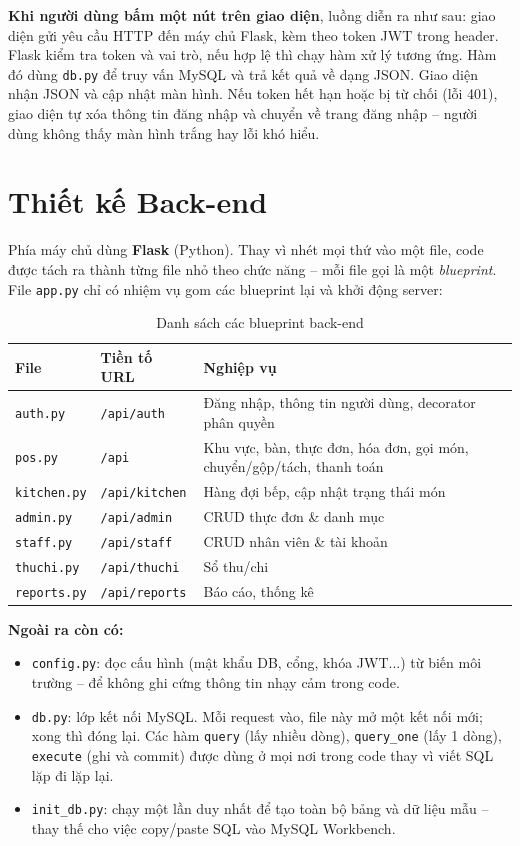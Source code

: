 \documentclass[12pt,a4paper]{report}
\newcommand{\code}[1]{\texttt{#1}}
\begin{document}
\textbf{Khi người dùng bấm một nút trên giao diện}, luồng diễn ra như sau: giao diện gửi yêu cầu HTTP đến máy chủ Flask, kèm theo token JWT trong header. Flask kiểm tra token và vai trò, nếu hợp lệ thì chạy hàm xử lý tương ứng. Hàm đó dùng \code{db.py} để truy vấn MySQL và trả kết quả về dạng JSON. Giao diện nhận JSON và cập nhật màn hình. Nếu token hết hạn hoặc bị từ chối (lỗi 401), giao diện tự xóa thông tin đăng nhập và chuyển về trang đăng nhập -- người dùng không thấy màn hình trắng hay lỗi khó hiểu.

\section{Thiết kế Back-end}

Phía máy chủ dùng \textbf{Flask} (Python). Thay vì nhét mọi thứ vào một file, code được tách ra thành từng file nhỏ theo chức năng -- mỗi file gọi là một \textit{blueprint}. File \code{app.py} chỉ có nhiệm vụ gom các blueprint lại và khởi động server:

\begin{table}[H]
\centering
\caption{Danh sách các blueprint back-end}
\begin{tabularx}{\textwidth}{L{2.8cm} L{3.2cm} X}
\toprule
\textbf{File} & \textbf{Tiền tố URL} & \textbf{Nghiệp vụ} \\
\midrule
\code{auth.py} & \code{/api/auth} & Đăng nhập, thông tin người dùng, decorator phân quyền \\
\code{pos.py} & \code{/api} & Khu vực, bàn, thực đơn, hóa đơn, gọi món, chuyển/gộp/tách, thanh toán \\
\code{kitchen.py} & \code{/api/kitchen} & Hàng đợi bếp, cập nhật trạng thái món \\
\code{admin.py} & \code{/api/admin} & CRUD thực đơn \& danh mục \\
\code{staff.py} & \code{/api/staff} & CRUD nhân viên \& tài khoản \\
\code{thuchi.py} & \code{/api/thuchi} & Sổ thu/chi \\
\code{reports.py} & \code{/api/reports} & Báo cáo, thống kê \\
\bottomrule
\end{tabularx}
\end{table}

\textbf{Ngoài ra còn có:}
\begin{itemize}
  \item \code{config.py}: đọc cấu hình (mật khẩu DB, cổng, khóa JWT...) từ biến môi trường -- để không ghi cứng thông tin nhạy cảm trong code.
  \item \code{db.py}: lớp kết nối MySQL. Mỗi request vào, file này mở một kết nối mới; xong thì đóng lại. Các hàm \code{query} (lấy nhiều dòng), \code{query\_one} (lấy 1 dòng), \code{execute} (ghi và commit) được dùng ở mọi nơi trong code thay vì viết SQL lặp đi lặp lại.
  \item \code{init\_db.py}: chạy một lần duy nhất để tạo toàn bộ bảng và dữ liệu mẫu -- thay thế cho việc copy/paste SQL vào MySQL Workbench.
\end{itemize}
\end{document}
